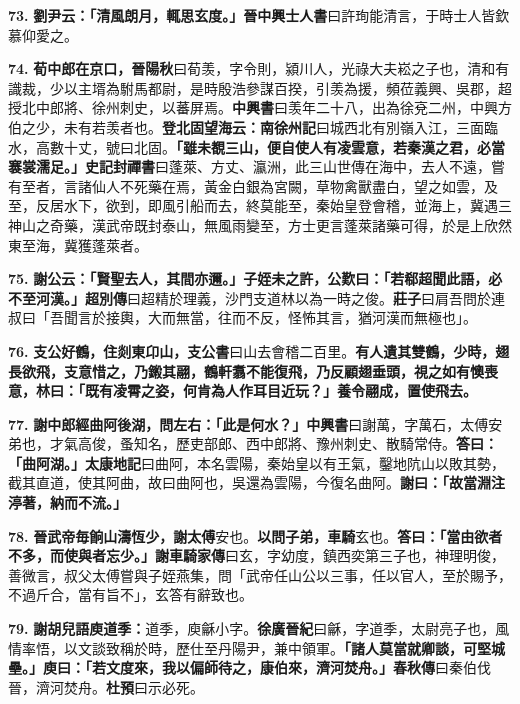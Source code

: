 \textbf{73.} \textbf{劉尹云：「清風朗月，輒思玄度。」}{\footnotesize \textbf{晉中興士人書}曰許珣能清言，于時士人皆欽慕仰愛之。}

\textbf{74.} \textbf{荀中郎在京口，}{\footnotesize \textbf{晉陽秋}曰荀羡，字令則，潁川人，光祿大夫崧之子也，清和有識裁，少以主壻為駙馬都尉，是時殷浩參謀百揆，引羡為援，頻莅義興、吳郡，超授北中郎將、徐州刺史，以蕃屏焉。\textbf{中興書}曰羡年二十八，出為徐兗二州，中興方伯之少，未有若羡者也。}\textbf{登北固望海云：}{\footnotesize \textbf{南徐州記}曰城西北有別嶺入江，三面臨水，高數十丈，號曰北固。}\textbf{「雖未覩三山，便自使人有凌雲意，若秦漢之君，必當褰裳濡足。」}{\footnotesize \textbf{史記封禪書}曰蓬萊、方丈、瀛洲，此三山世傳在海中，去人不遠，嘗有至者，言諸仙人不死藥在焉，黃金白銀為宮闕，草物禽獸盡白，望之如雲，及至，反居水下，欲到，即風引船而去，終莫能至，秦始皇登會稽，並海上，冀遇三神山之奇藥，漢武帝既封泰山，無風雨變至，方士更言蓬萊諸藥可得，於是上欣然東至海，冀獲蓬萊者。}

\textbf{75.} \textbf{謝公云：「賢聖去人，其間亦邇。」子姪未之許，公歎曰：「若郗超聞此語，必不至河漢。」}{\footnotesize \textbf{超別傳}曰超精於理義，沙門支道林以為一時之俊。\textbf{莊子}曰肩吾問於連叔曰「吾聞言於接輿，大而無當，往而不反，怪怖其言，猶河漢而無極也」。}

\textbf{76.} \textbf{支公好鶴，住剡東卬山，}{\footnotesize \textbf{支公書}曰山去會稽二百里。}\textbf{有人遺其雙鶴，少時，翅長欲飛，支意惜之，乃鎩其翮，鶴軒翥不能復飛，乃反顧翅垂頭，視之如有懊喪意，林曰：「既有凌霄之姿，何肯為人作耳目近玩？」養令翮成，置使飛去。}

\textbf{77.} \textbf{謝中郎經曲阿後湖，問左右：「此是何水？」}{\footnotesize \textbf{中興書}曰謝萬，字萬石，太傅安弟也，才氣高俊，蚤知名，歷吏部郎、西中郎將、豫州刺史、散騎常侍。}\textbf{答曰：「曲阿湖。」}{\footnotesize \textbf{太康地記}曰曲阿，本名雲陽，秦始皇以有王氣，鑿地阬山以敗其勢，截其直道，使其阿曲，故曰曲阿也，吳還為雲陽，今復名曲阿。}\textbf{謝曰：「故當淵注渟著，納而不流。」}

\textbf{78.} \textbf{晉武帝毎餉山濤恆少，謝太傅}{\footnotesize 安也。}\textbf{以問子弟，車騎}{\footnotesize 玄也。}\textbf{答曰：「當由欲者不多，而使與者忘少。」}{\footnotesize \textbf{謝車騎家傳}曰玄，字幼度，鎮西奕第三子也，神理明俊，善微言，叔父太傅嘗與子姪燕集，問「武帝任山公以三事，任以官人，至於賜予，不過斤合，當有旨不」，玄答有辭致也。}

\textbf{79.} \textbf{謝胡兒語庾道季：}{\footnotesize 道季，庾龢小字。\textbf{徐廣晉紀}曰龢，字道季，太尉亮子也，風情率悟，以文談致稱於時，歷仕至丹陽尹，兼中領軍。}\textbf{「諸人莫當就卿談，可堅城壘。」庾曰：「若文度來，我以偏師待之，康伯來，濟河焚舟。」}{\footnotesize \textbf{春秋傳}曰秦伯伐晉，濟河焚舟。\textbf{杜預}曰示必死。}

